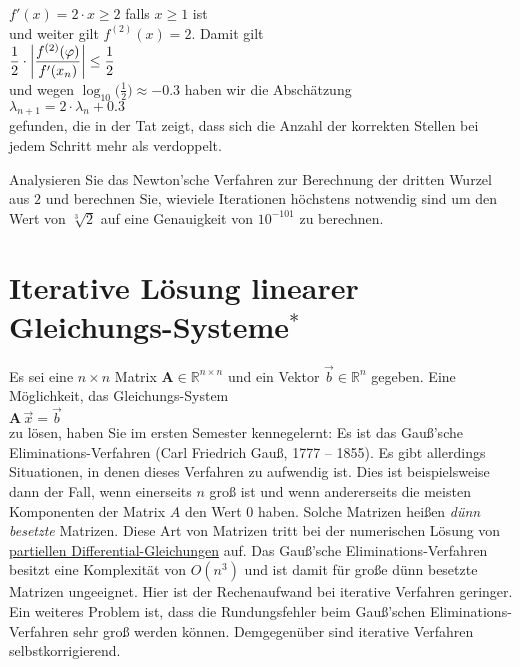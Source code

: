 \hspace*{1.3cm}
$f'(x) = 2 \cdot x \geq 2$ \quad falls $x \geq 1$ ist
\\[0.2cm]
und weiter gilt $f^{(2)}(x) = 2$.  Damit gilt
\\[0.2cm]
\hspace*{1.3cm}
$\displaystyle \frac{1}{2} \cdot \left|\frac{f^{(2)}(\varphi)}{f'(x_n)}\right| \leq \frac{1}{2}$
\\[0.2cm]
und wegen $\log_{10}\bigl(\frac{1}{2}\bigr) \approx - 0.3$ haben wir die Absch\"atzung
\\[0.2cm]
\hspace*{1.3cm}
$\lambda_{n+1} = 2 \cdot \lambda_{n} + 0.3$ 
\\[0.2cm]
gefunden, die in der Tat zeigt, dass sich die Anzahl der korrekten Stellen bei jedem Schritt mehr als verdoppelt.

\exercise
Analysieren Sie das Newton'sche Verfahren zur Berechnung der dritten Wurzel aus $2$ und berechnen Sie,
wieviele Iterationen h\"ochstens notwendig sind um den Wert von $\sqrt[3]{2}$ auf eine Genauigkeit von
$10^{-101}$ zu berechnen.
\eox




\section{Iterative L\"osung linearer Gleichungs-Systeme$^*$}
Es sei eine $n\times n$ Matrix $\mathbf{A} \in \mathbb{R}^{n\times n}$ und ein Vektor
 $\vec{b}\in \mathbb{R}^n$ gegeben.  Eine M\"oglichkeit, 
das Glei\-chungs-System 
\\[0.2cm]
\hspace*{1.3cm}
$\mathbf{A}\, \vec{x} = \vec{b}$
\\[0.2cm]
zu l\"osen, haben Sie im ersten Semester kennegelernt: Es ist das Gau{\ss}'sche
Eliminations-Verfahren (Carl Friedrich Gau{\ss}, 1777 -- 1855).  
Es gibt allerdings Situationen, in denen dieses
Verfahren zu 
aufwendig ist.  Dies ist beispielsweise dann der Fall, wenn einerseits $n$ gro{\ss} ist und
wenn andererseits die meisten Komponenten der Matrix $A$ den Wert 0 haben.  Solche
Matrizen hei{\ss}en \emph{d\"unn besetzte} Matrizen.  Diese Art von Matrizen tritt bei
der numerischen L\"osung von
\href{http://de.wikipedia.org/wiki/Partielle_Differentialgleichung}{partiellen Differential-Gleichungen} auf.   
Das Gau{\ss}'sche Eliminations-Verfahren besitzt  eine
Komplexit\"at von $O(n^3)$ und ist damit f\"ur gro{\ss}e d\"unn besetzte Matrizen ungeeignet.
Hier ist der Rechenaufwand bei iterative Verfahren geringer.   
Ein weiteres Problem ist, dass die Rundungsfehler beim Gau{\ss}'schen Eliminations-Verfahren
sehr gro{\ss} werden k\"onnen.  Demgegen\"uber sind iterative Verfahren selbstkorrigierend.

